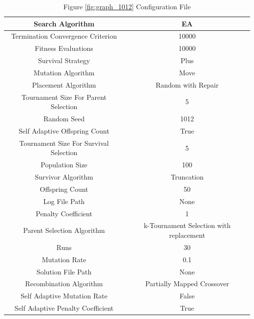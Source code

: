 \documentclass{standalone}
\begin{document}
\begin{table}[!htb]
	\centering
	\caption{Figure \ref{fig:graph_1012} Configuration File}
	\label{tab:graph_1012}
	\begin{tabular}{| c | c |}
		\hline
		Search Algorithm		& EA		 \\
		\hline
		Termination Convergence Criterion		& 10000		 \\
		\hline
		Fitness Evaluations		& 10000		 \\
		\hline
		Survival Strategy		& Plus		 \\
		\hline
		Mutation Algorithm		& Move		 \\
		\hline
		Placement Algorithm		& Random with Repair		 \\
		\hline
		Tournament Size For Parent Selection		& 5		 \\
		\hline
		Random Seed		& 1012		 \\
		\hline
		Self Adaptive Offspring Count		& True		 \\
		\hline
		Tournament Size For Survival Selection		& 5		 \\
		\hline
		Population Size		& 100		 \\
		\hline
		Survivor Algorithm		& Truncation		 \\
		\hline
		Offspring Count		& 50		 \\
		\hline
		Log File Path		& None		 \\
		\hline
		Penalty Coefficient		& 1		 \\
		\hline
		Parent Selection Algorithm		& k-Tournament Selection with replacement		 \\
		\hline
		Runs		& 30		 \\
		\hline
		Mutation Rate		& 0.1		 \\
		\hline
		Solution File Path		& None		 \\
		\hline
		Recombination Algorithm		& Partially Mapped Crossover		 \\
		\hline
		Self Adaptive Mutation Rate		& False		 \\
		\hline
		Self Adaptive Penalty Coefficient		& True		 \\
		\hline
	\end{tabular}
\end{table}
\end{document}
